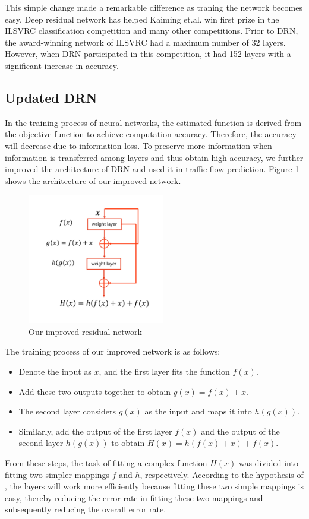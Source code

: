 \documentclass[twocolumn]{article}
\begin{document}
\par
This simple change made a remarkable difference as traning the network becomes easy. Deep residual network has helped Kaiming et.al. win first prize in the ILSVRC classification competition and many other competitions. Prior to DRN, the award-winning network of ILSVRC had a maximum number of 32 layers. However, when DRN participated in this competition, it had 152 layers with a significant increase in accuracy.

\subsection{Updated DRN} \label{sec:improv}
In the training process of neural networks, the estimated function is derived from the objective function to achieve computation accuracy. Therefore, the accuracy will decrease due to information loss.
To preserve more information when information is transferred among layers and thus obtain high accuracy, we further improved the architecture of DRN and used it in traffic flow prediction. Figure \ref{fig:imp_nn} shows the architecture of our improved network.
\begin{figure}[H]
    \centering
    \includegraphics[width = 6cm]{fig/improved_NN.pdf}
    \caption{Our improved residual network}
    \label{fig:imp_nn}
\end{figure}

\par
The training process of our improved network is as follows: 
\begin{itemize}
    \item Denote the input as $x$, and the first layer fits the function $f(x)$. 
    \item Add these two outputs together to obtain $g(x) = f(x) +x $. 
    \item The second layer considers $g(x)$ as the input and maps it into $h(g(x))$. 
    \item Similarly, add the output of the first layer $f(x)$ and the output of the second   layer $h(g(x))$ to obtain $H(x) = h(f(x)+x) + f(x)$. 
\end{itemize}
\par 
From these steps, the task of fitting a complex function $H(x)$ was divided into fitting two simpler mappings $f$ and $h$, respectively. According to the hypothesis of \citet{DRN}, the layers will work more efficiently because fitting these two simple mappings is easy, thereby reducing the error rate in fitting these two mappings and subsequently reducing the overall error rate.
\end{document}
